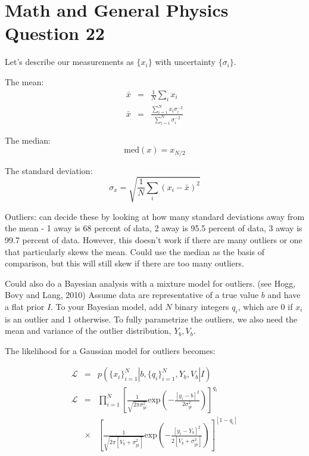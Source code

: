 \documentclass[a4paper,11pt]{scrartcl}
\begin{document}
\section*{Math and General Physics Question 22}

Let's describe our measurements as $\{x_i\}$ with uncertainty $\{\sigma_i\}$.

The mean:
\begin{eqnarray}
\bar{x} &=& \frac{1}{N}\sum_i x_i\\
\bar{x} &=& \frac{\sum_{i=1}^N x_i\sigma_i^{-2}}{\sum_{i=1}^N \sigma_i^{-2}}
\end{eqnarray}

The median:
\begin{equation}
\mathrm{med}(x) = x_{N/2}
\end{equation}

The standard deviation:
\begin{equation}
\sigma_x = \sqrt{\frac{1}{N}\sum_i (x_i-\bar{x})^2}
\end{equation}

Outliers: can decide these by looking at how many standard deviations away from the mean - 1 away is 68 percent of data, 2 away is 95.5 percent of data, 3 away is 99.7 percent of data. However, this doesn't work if there are many outliers or one that particularly skews the mean. Could use the median as the basis of comparison, but this will still skew if there are too many outliers.

Could also do a Bayesian analysis with a mixture model for outliers. (see Hogg, Bovy and Lang, 2010) Assume data are representative of a true value $b$ and have a flat prior $I$. To your Bayesian model, add $N$ binary integers $q_i$, which are 0 if $x_i$ is an outlier and 1 otherwise. To fully parametrize the outliers, we also need the mean and variance of the outlier distribution, $Y_b, V_b$.

The likelihood for a Gaussian model for outliers becomes:

\begin{eqnarray}
\mathcal{L} &=& p(\{x_i\}_{i=1}^N|b,\{q_i\}_{i=1}^N, Y_b,V_b|I)\\
\mathcal{L} &=& \prod_{i=1}^N \left[\frac{1}{\sqrt{2\pi\sigma_{yi}^2}}\mathrm{exp}\left(-\frac{[y_i-b]^2}{2\sigma_{yi}^2}\right)\right]^{q_i}\\
&\times& \left[\frac{1}{\sqrt{2\pi[V_b+\sigma^2_{yi}]}}\mathrm{exp}\left(-\frac{[y_i-Y_b]^2}{2[V_b+\sigma_{yi}^2]}\right)\right]^{[1-q_i]}
\end{eqnarray}
\end{document}
